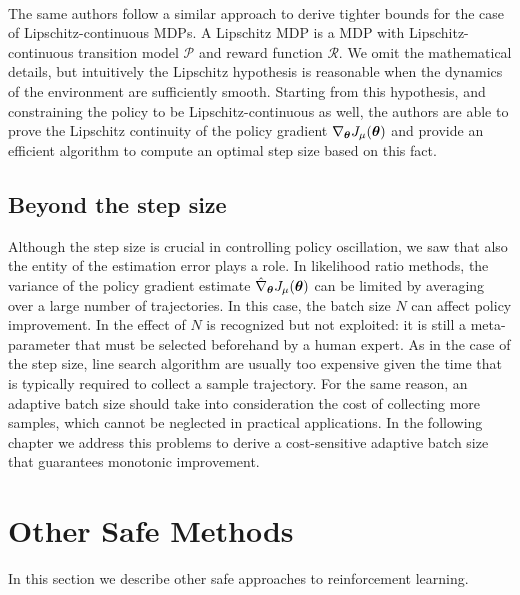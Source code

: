 \paragraph{} %
The same authors \cite{pirotta2015policy} follow a similar approach to derive tighter bounds for the case of Lipschitz-continuous \ac{MDP}s. A Lipschitz \ac{MDP} is a \ac{MDP} with Lipschitz-continuous transition model $\mathcal{P}$ and reward function $\mathcal{R}$. We omit the mathematical details, but intuitively the Lipschitz hypothesis is reasonable when the dynamics of the environment are sufficiently smooth. Starting from this hypothesis, and constraining the policy to be Lipschitz-continuous as well, the authors are able to prove the Lipschitz continuity of the policy gradient $\nabla_{\boldsymbol{\theta}}J_\mu(\boldsymbol{\theta})$ and provide an efficient algorithm to compute an optimal step size based on this fact.
 
\subsection{Beyond the step size}\label{sec:beyond}
Although the step size is crucial in controlling policy oscillation, we saw that also the entity of the estimation error plays a role. In likelihood ratio methods, the variance of the policy gradient estimate $\hat{\nabla}_{\boldsymbol{\theta}}J_{\mu}(\boldsymbol{\theta})$ can be limited by averaging over a large number of trajectories. In this case, the batch size $N$ can affect policy improvement. In \cite{NIPS2013_5186} the effect of $N$ is recognized but not exploited: it is still a meta-parameter that must be selected beforehand by a human expert. As in the case of the step size, line search algorithm are usually too expensive given the time that is typically required to collect a sample trajectory. For the same reason, an adaptive batch size should take into consideration the cost of collecting more samples, which cannot be neglected in practical applications. In the following chapter we address this problems to derive a cost-sensitive adaptive batch size that guarantees monotonic improvement.



\section{Other Safe Methods}\label{sec:other_safe}
In this section we describe other safe approaches to reinforcement learning.

